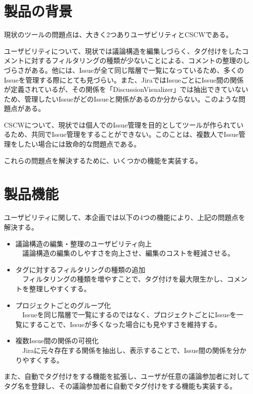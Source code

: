 \documentclass[12pt, oneside]{jreport}
\begin{document}
	\section{製品の背景}
	現状のツールの問題点は、大きく2つありユーザビリティとCSCWである。
	
	ユーザビリティについて、現状では議論構造を編集しづらく、タグ付けをしたコメントに対するフィルタリングの種類が少ないことによる、コメントの整理のしづらさがある。他には、Issueが全て同じ階層で一覧になっているため、多くのIssueを管理する際にとても見づらい。また、JiraではIssueごとにIssue間の関係が定義されているが、その関係を「DiscussionVisualizer」では抽出できていないため、管理したいIssueがどのIssueと関係があるのか分からない。このような問題点がある。
	
	CSCWについて、現状では個人でのIssue管理を目的としてツールが作られているため、共同でIssue管理をすることができない。このことは、複数人でIssue管理をしたい場合には致命的な問題点である。
	
	これらの問題点を解決するために、いくつかの機能を実装する。
	
	\section{製品機能}
	ユーザビリティに関して、本企画では以下の4つの機能により、上記の問題点を解決する。
	\begin{itemize}
		\item 議論構造の編集・整理のユーザビリティ向上
		\\
		　議論構造の編集のしやすさを向上させ、編集のコストを軽減させる。
		\item タグに対するフィルタリングの種類の追加
		\\
		　フィルタリングの種類を増やすことで、タグ付けを最大限生かし、コメントを整理しやすくする。
		\item プロジェクトごとのグループ化
		\\
		　Issueを同じ階層で一覧にするのではなく、プロジェクトごとにIssueを一覧にすることで、Issueが多くなった場合にも見やすさを維持する。
		\item 複数Issue間の関係の可視化
		\\
		　Jiraに元々存在する関係を抽出し、表示することで、Issue間の関係を分かりやすくする。
	\end{itemize}
	
	また、自動でタグ付けをする機能を拡張し、ユーザが任意の議論参加者に対してタグ名を登録し、その議論参加者に自動でタグ付けをする機能も実装する。
	\\
	
\end{document}
